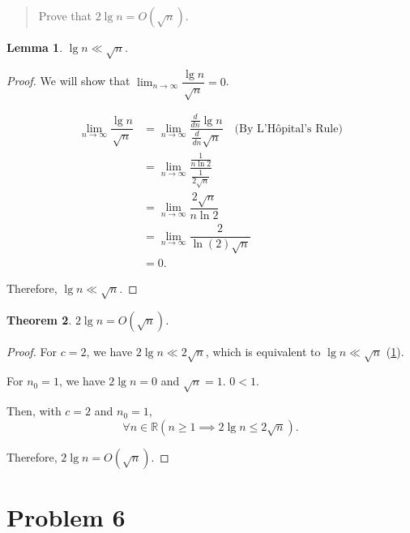 \documentclass[12pt]{article}
\newtheorem{theorem}{Theorem}[section]
\newtheorem{lemma}[theorem]{Lemma}
\theoremstyle{definition}
\begin{document}
\newpage

\subsection{}

\begin{quote}
  Prove that $2 \lg n = O(\sqrt n)$.
\end{quote}

\begin{lemma}
  \label{growth}
  $\lg n \ll \sqrt n$.
\end{lemma}

\begin{proof}
  We will show that $\lim_{n \to \infty} \dfrac{\lg n}{\sqrt n} = 0$.

  \begin{align*}
    \lim_{n \to \infty} \dfrac{\lg n}{\sqrt n} & =
    \lim_{n \to \infty} \dfrac{\frac{d}{dn} \lg n}{\frac{d}{dn}
    \sqrt n} \quad \text{(By
    L'Hôpital's Rule)} \\
    & = \lim_{n \to \infty} \dfrac{\frac{1}{n \ln 2}}{\frac{1}{2 \sqrt n}} \\
    & = \lim_{n \to \infty} \dfrac{2 \sqrt n}{n \ln 2} \\
    & = \lim_{n \to \infty} \dfrac{2}{\ln(2) \sqrt n} \\
    & = 0.
  \end{align*}

  Therefore, $\lg n \ll \sqrt n$.
\end{proof}

\begin{theorem}
  $2 \lg n = O(\sqrt n)$.
\end{theorem}

\begin{proof}
  For $c = 2$, we have $2 \lg n \ll 2 \sqrt n$, which is equivalent to
  $\lg n \ll \sqrt n$ (\cref{growth}).

  For $n_0 = 1$, we have $2 \lg n = 0$ and $\sqrt n = 1$. $0 < 1$.

  Then, with $c = 2$ and $n_0 = 1$,
  $$ \forall n \in \mathbb R (n \geq 1 \implies 2 \lg n \leq
  2 \sqrt n). $$

  Therefore, $2 \lg n = O(\sqrt n)$.
\end{proof}

\newpage

\section{Problem 6}
\end{document}
